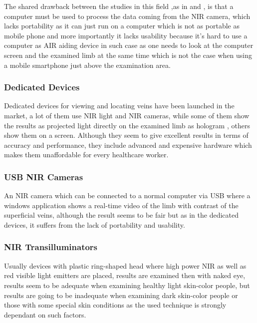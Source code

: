 The shared drawback between the studies in this field ,as in  \parencite{study1} and  \parencite{study2}, is that a computer must be used to process the data coming
from the NIR camera, which lacks portability as it can just run on a computer which is not as portable as
mobile phone and more importantly it lacks usability because it’s hard to use a
computer as AIR aiding device in such case as one needs to look at the computer screen
and the examined limb at the same time which is not the case when using a mobile
smartphone just above the examination area.

\subsubsection{Dedicated Devices}
Dedicated devices for viewing and locating veins have been launched in the market, a lot of them use NIR light and NIR cameras, while some of them
show the results as projected light directly on the examined limb as hologram , others show
them on a screen. Although they seem to give excellent results in terms of accuracy and
performance, they include advanced and expensive hardware which makes them
unaffordable for every healthcare worker. 
\subsubsection{USB NIR Cameras}
An NIR camera which can be connected to a normal computer via USB where a windows
application shows a real-time video of the limb with contrast of the superficial veins, although
the result seems to be fair but as in the dedicated devices, it suffers from the lack of portability and usability.

\subsubsection{NIR Transilluminators}

Usually devices with plastic ring-shaped head where high power NIR as well as red visible light
emitters are placed, results are examined then with naked eye, results seem to be adequate
when examining healthy light skin-color people, but results are going to be
inadequate when examining dark skin-color people or those with some special skin conditions
as the used technique is strongly dependant on such factors.



 